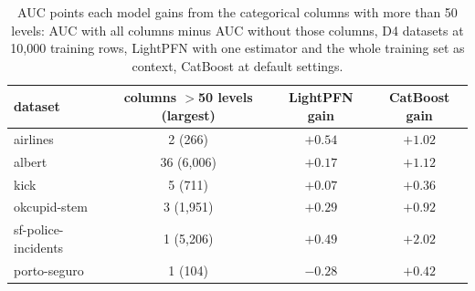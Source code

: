 \documentclass[11pt]{article}
\begin{document}
\begin{table}[t]
\centering
\footnotesize
\begin{tabular}{lccc}
\toprule
dataset & columns $>$50 levels (largest) & LightPFN gain & CatBoost gain \\
\midrule
airlines & 2 (266) & $+0.54$ & $+1.02$ \\
albert & 36 (6,006) & $+0.17$ & $+1.12$ \\
kick & 5 (711) & $+0.07$ & $+0.36$ \\
okcupid-stem & 3 (1,951) & $+0.29$ & $+0.92$ \\
sf-police-incidents & 1 (5,206) & $+0.49$ & $+2.02$ \\
porto-seguro & 1 (104) & $-0.28$ & $+0.42$ \\
\bottomrule
\end{tabular}
\caption{AUC points each model gains from the categorical columns with more than 50 levels: AUC with all
columns minus AUC without those columns, D4 datasets at 10,000 training rows, LightPFN with one estimator and
the whole training set as context, CatBoost at default settings.}
\label{tab:hicard}
\end{table}
\end{document}
